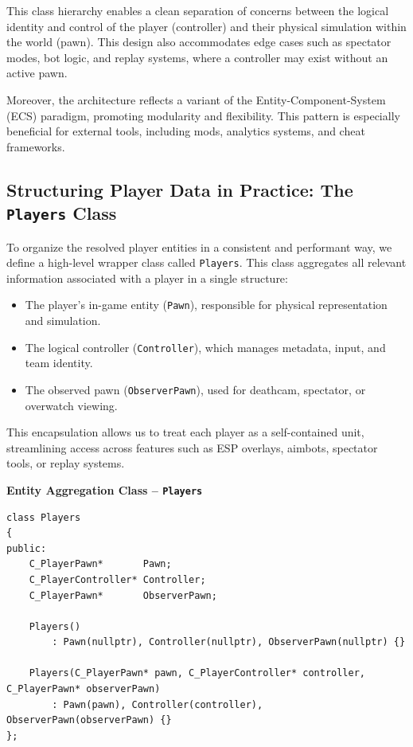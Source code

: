 \bigskip

This class hierarchy enables a clean separation of concerns between the logical identity and control of the player (controller) and their physical simulation within the world (pawn). This design also accommodates edge cases such as spectator modes, bot logic, and replay systems, where a controller may exist without an active pawn.

Moreover, the architecture reflects a variant of the Entity-Component-System (ECS) paradigm, promoting modularity and flexibility. This pattern is especially beneficial for external tools, including mods, analytics systems, and cheat frameworks.


\subsection{Structuring Player Data in Practice: The \texttt{Players} Class}

To organize the resolved player entities in a consistent and performant way, we define a high-level wrapper class called \texttt{Players}. This class aggregates all relevant information associated with a player in a single structure:

\begin{itemize}
    \item The player's in-game entity (\texttt{Pawn}), responsible for physical representation and simulation.
    \item The logical controller (\texttt{Controller}), which manages metadata, input, and team identity.
    \item The observed pawn (\texttt{ObserverPawn}), used for deathcam, spectator, or overwatch viewing.
\end{itemize}

This encapsulation allows us to treat each player as a self-contained unit, streamlining access across features such as ESP overlays, aimbots, spectator tools, or replay systems.

\vspace{1em}
\noindent\textbf{Entity Aggregation Class – \texttt{Players}}

\begin{lstlisting}[style=cppstyle, caption={Players – Unified Player Representation}]
class Players
{
public:
    C_PlayerPawn*       Pawn;       
    C_PlayerController* Controller; 
    C_PlayerPawn*       ObserverPawn;  

    Players()
        : Pawn(nullptr), Controller(nullptr), ObserverPawn(nullptr) {}

    Players(C_PlayerPawn* pawn, C_PlayerController* controller, C_PlayerPawn* observerPawn)
        : Pawn(pawn), Controller(controller), ObserverPawn(observerPawn) {}
};
\end{lstlisting}

